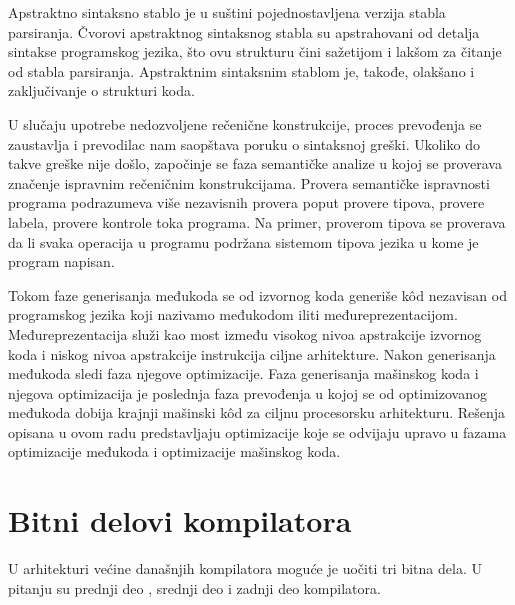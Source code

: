 \documentclass[12pt,oneside]{memoir}
\begin{document}
Apstraktno sintaksno stablo je u suštini pojednostavljena verzija stabla parsiranja. 
Čvorovi apstraktnog sintaksnog stabla su apstrahovani od detalja sintakse programskog jezika, što ovu strukturu čini sažetijom i lakšom za čitanje od stabla parsiranja.
Apstraktnim sintaksnim stablom je, takođe, olakšano i zaključivanje o strukturi koda.

U slučaju upotrebe nedozvoljene rečenične konstrukcije, proces prevođenja se zaustavlja i prevodilac nam saopštava poruku o sintaksnoj greški. Ukoliko do takve greške nije došlo, započinje se faza semantičke analize u kojoj se proverava značenje ispravnim rečeničnim konstrukcijama. Provera semantičke ispravnosti programa podrazumeva više nezavisnih provera poput provere tipova, provere labela, provere kontrole toka programa. Na primer, proverom tipova se proverava da li svaka operacija u programu podržana sistemom tipova jezika u kome je program napisan.

Tokom faze generisanja međukoda se od izvornog koda generiše k\^od nezavisan od programskog jezika koji nazivamo međukodom iliti međureprezentacijom. Međureprezentacija služi kao most između visokog nivoa apstrakcije izvornog koda i niskog nivoa apstrakcije instrukcija ciljne arhitekture. Nakon generisanja međukoda sledi faza njegove optimizacije. Faza generisanja mašinskog koda i njegova optimizacija je poslednja faza prevođenja u kojoj se od optimizovanog međukoda dobija krajnji mašinski k\^od za ciljnu procesorsku arhitekturu. Rešenja opisana u ovom radu predstavljaju optimizacije koje se odvijaju upravo u fazama optimizacije međukoda i optimizacije mašinskog koda.



\section{Bitni delovi kompilatora}
\label{sec:kompilatori}
U arhitekturi većine današnjih kompilatora moguće je uočiti tri bitna dela. 
U pitanju su prednji deo \cite{frontend_quote}, srednji deo \cite{middleend_quote} i zadnji deo \cite{backend_quote} kompilatora.
\end{document}
